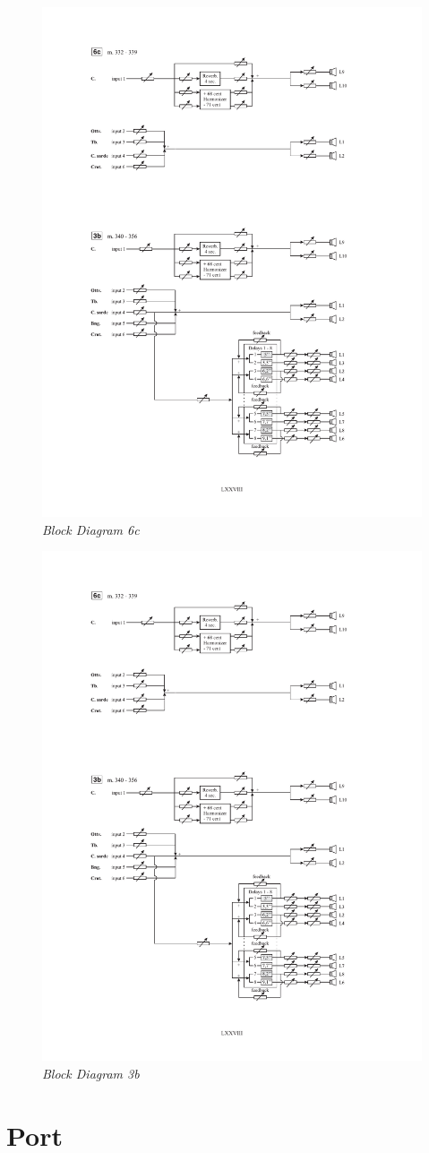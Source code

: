 \documentclass[twoside,a4paper]{article}
\begin{document}
\begin{figure}[ht]
\centerline{\includegraphics[width=.45\textwidth]{img/re-diagramma6c}}
\caption{\label{re-dia-6c}{\it Block Diagram 6c}}
\end{figure}

\begin{figure}[ht]
\centerline{\includegraphics[width=.45\textwidth]{img/re-diagramma3b}}
\caption{\label{re-dia-3b}{\it Block Diagram 3b}}
\end{figure}


\section{Port}
\label{sec:porting}
\end{document}
